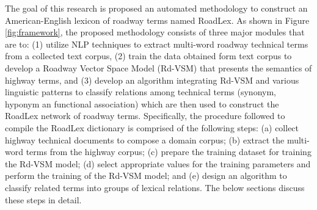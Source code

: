\documentclass[Journal,InsideFigs, DoubleSpace]{ascelike} %
\begin{document}
The goal of this research is proposed an automated methodology to construct an American-English lexicon of roadway terms named RoadLex. As shown in Figure \ref{fig:framework}, the proposed methodology consists of three major modules that are to: (1) utilize NLP techniques to extract multi-word roadway technical terms from a collected text corpus, (2) train the data obtained form text corpus to develop a Roadway Vector Space Model (Rd-VSM) that presents the semantics of highway terms, and (3) develop an algorithm integrating Rd-VSM and various linguistic patterns to classify relations among technical terms (synonym, hyponym an functional association) which are then used to construct the RoadLex network of roadway terms. Specifically, the procedure followed to compile the RoadLex dictionary is comprised of the following steps: (a) collect highway technical documents to compose a domain corpus; (b) extract the multi-word terms from the highway corpus; (c) prepare the training dataset for training the Rd-VSM model; (d) select appropriate values for the training parameters and perform the training of the Rd-VSM model; and (e) design an algorithm to classify related terms into groups of lexical relations. The below sections discuss these steps in detail.

%
%
\end{document}
